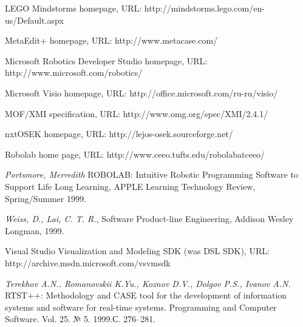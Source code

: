 \documentclass[a4paper]{article}
\begin{document}
\begin{thebibliography}{9001}
   LEGO Mindstorms homepage, URL: http://mindstorms.lego.com/en-us/Default.aspx

   MetaEdit+ homepage, URL: http://www.metacase.com/ 

   Microsoft Robotics Developer Studio homepage, URL: http://www.microsoft.com/robotics/ 

   Microsoft Visio homepage, URL: http://office.microsoft.com/ru-ru/visio/

   MOF/XMI specification, URL: http://www.omg.org/spec/XMI/2.4.1/ 

   nxtOSEK homepage, URL: http://lejos-osek.sourceforge.net/ 

   Robolab home page, URL: http://www.ceeo.tufts.edu/robolabatceeo/ 

   \emph{Portsmore, Merredith} ROBOLAB: Intuitive Robotic Programming Software to Support Life Long Learning, APPLE Learning Technology Review, Spring/Summer 1999.

   \emph{Weiss, D., Lai, C. T. R.}, Software Product-line Engineering, Addison Wesley Longman, 1999.

   Visual Studio Visualization and Modeling SDK (was DSL SDK), URL: http://archive.msdn.microsoft.com/vsvmsdk 

   \emph{Terekhov A.N., Romanovskii K.Yu., Koznov D.V., Dolgov P.S., Ivanov A.N.} RTST++: Methodology and CASE tool for the development of information systems and software for real-time systems. Programming and Computer Software. Vol. 25. № 5. 1999.С. 276--281.

\end{thebibliography}
\end{document}
